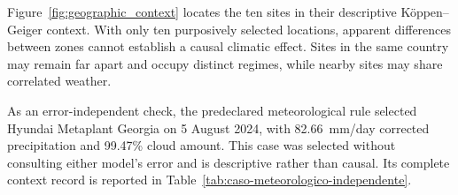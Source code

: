 Figure~\ref{fig:geographic_context} locates the ten sites in their descriptive
K\"oppen--Geiger context. With only ten purposively selected locations,
apparent differences between zones cannot establish a causal climatic effect.
Sites in the same country may remain far apart and occupy distinct regimes,
while nearby sites may share correlated weather.

As an error-independent check, the predeclared meteorological rule selected
Hyundai Metaplant Georgia on 5 August 2024, with 82.66~mm/day corrected
precipitation and 99.47\% cloud amount. This case was selected without
consulting either model's error and is descriptive rather than causal. Its
complete context record is reported in
Table~\ref{tab:caso-meteorologico-independente}.


